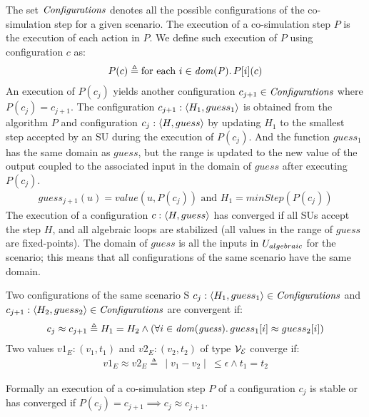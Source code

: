 The set $\mathit{Configurations}$ denotes all the possible configurations of the co-simulation step for a given scenario. The execution of a co-simulation step $P$ is the execution of each action in $P$. We define such execution of $P$ using configuration $c$ as:
\vspace{-1em}
\begin{align}
  P(c) \triangleq \text{for each } i \in \mathit{dom(P)} \ldotp P[i](c)
\end{align}
An execution of $P(c_j)$ yields another configuration $c_{j+1} \in \mathit{Configurations}$ where $P(c_j) = c_{j+1}$. The configuration $c_{j+1}:  \left\langle H_1, guess_1 \right\rangle $ is obtained from the algorithm $P$ and configuration $c_j:  \left\langle H, guess \right\rangle $ by updating $H_1$ to the smallest step accepted by an SU during the execution of $P(c_j)$. And the function $guess_1$ has the same domain as $guess$, but the range is updated to the new value of the output coupled to the associated input in the domain of $guess$ after executing $P(c_j)$.
\vspace{-1em}
\begin{align}
  guess_{j+1}(u) = value(u,P(c_j)) \text{ and } H_1 = minStep(P(c_j))  
\end{align}  
The execution of a configuration $c:  \left\langle H, guess \right\rangle $ has converged if all SUs accept the step $H$, and all algebraic loops are stabilized (all values in the range of $guess$ are fixed-points). The domain of $guess$ is all the inputs in $U_{algebraic}$ for the scenario; this means that all configurations of the same scenario have the same domain.
\begin{definition}\label{def:convergent}
  Two configurations of the same scenario S $c_j: \left\langle H_1,guess_1 \right\rangle  \in \mathit{Configurations}$ and $c_{j+1}:  \left\langle H_2, guess_2 \right\rangle  \in \mathit{Configurations}$ are convergent if:
  \vspace{-1em}
  \begin{align*}
    c_j \approx c_{j+1} \triangleq H_1 = H_2 \land (\forall i \in \mathit{dom(guess)} \ldotp guess_1[i] \approx guess_2[i])
  \end{align*}
  Two values $v1_E: (v_1, t_1)$ and $v2_E: (v_2, t_2)$ of type $\mathcal{V_{E}}$ converge if:
  \begin{align}
    v1_E \approx v2_E \triangleq \, \mid v_1 - v_2 \mid \ \leq \epsilon \land t_1 = t_2
  \end{align}
\end{definition}

Formally an execution of a co-simulation step $P$ of a configuration $c_j$ is stable or has converged if $P(c_j) = c_{j+1} \implies c_j \approx c_{j+1}$.

